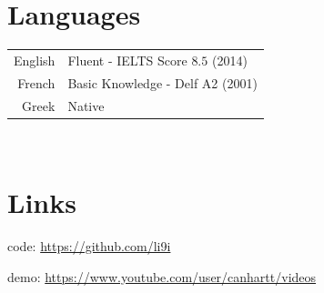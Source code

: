 \documentclass[a4paper,10pt,twoside]{article}
\begin{document}

\section{Languages}

\begin{tabular}{rp{12cm}}
English & Fluent - IELTS Score $8.5$ (2014) \\
French & Basic Knowledge - Delf A2 (2001) \\
Greek & Native
\end{tabular} \\



\section{Links}
code: \url{https://github.com/li9i}

demo: \url{https://www.youtube.com/user/canhartt/videos}
\end{document}
